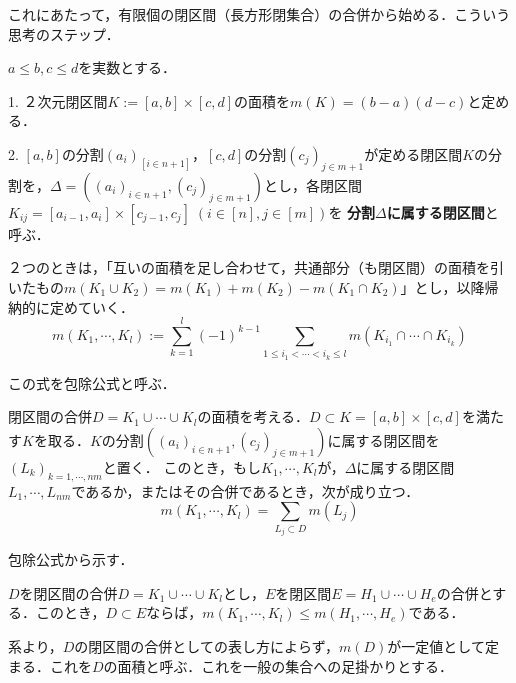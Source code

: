 \documentclass[uplatex, dvipdfmx]{jsreport}
\begin{document}
これにあたって，有限個の閉区間（長方形閉集合）の合併から始める．こういう思考のステップ．
\begin{definition}[２次元閉区間の面積とその分割]
    $a\le b,c\le d$を実数とする．

    1. ２次元閉区間$K:=[a,b]\times [c,d]$の面積を$m(K)=(b-a)(d-c)$と定める．

    2. $[a,b]$の分割$(a_i)_[i\in n+1]$，$[c,d]$の分割$(c_j)_{j\in m+1}$が定める閉区間$K$の分割を，$\Delta=((a_i)_{i\in n+1},(c_j)_{j\in m+1})$とし，各閉区間$K_{ij}=[a_{i-1},a_i]\times [c_{j-1},c_j]\; (i\in [n],j\in [m])$を
    \textbf{分割$\Delta$に属する閉区間}と呼ぶ．
\end{definition}
\begin{definition*}[有限個の区間の合併の面積]
    ２つのときは，「互いの面積を足し合わせて，共通部分（も閉区間）の面積を引いたもの$m(K_1\cup K_2)=m(K_1)+m(K_2)-m(K_1\cap K_2)$」とし，以降帰納的に定めていく．
    \[ m(K_1,\cdots,K_l):=\sum^l_{k=1}(-1)^{k-1} \sum_{1\le i_1<\cdots<i_k\le l} m(K_{i_1}\cap\cdots\cap K_{i_k}) \]
\end{definition*}
\begin{remark*}
    この式を包除公式と呼ぶ．
\end{remark*}

\begin{lemma}[小学校での面積の授業を数学の言葉に落とし込む！]
    閉区間の合併$D=K_1\cup\cdots\cup K_l$の面積を考える．$D\subset K=[a,b]\times [c,d]$を満たす$K$を取る．$K$の分割$((a_i)_{i\in n+1},(c_j)_{j\in m+1})$に属する閉区間を$(L_k)_{k=1,\cdots,nm}$と置く．
    このとき，もし$K_1,\cdots,K_l$が，$\Delta$に属する閉区間$L_1,\cdots,L_{nm}$であるか，またはその合併であるとき，次が成り立つ．
    \[ m(K_1,\cdots,K_l)=\sum_{L_j\subset D}m(L_j) \]
\end{lemma}
包除公式から示す．

\begin{corollary}
    $D$を閉区間の合併$D=K_1\cup\cdots\cup K_l$とし，$E$を閉区間$E=H_1\cup\cdots\cup H_e$の合併とする．このとき，$D\subset E$ならば，$m(K_1,\cdots,K_l)\le m(H_1,\cdots,H_e)$である．
\end{corollary}
\begin{definition*}
    系より，$D$の閉区間の合併としての表し方によらず，$m(D)$が一定値として定まる．これを$D$の面積と呼ぶ．これを一般の集合への足掛かりとする．
\end{definition*}
\end{document}
